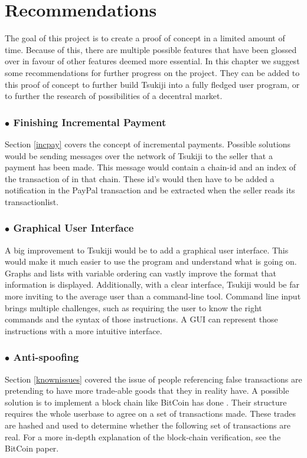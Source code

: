 \section{Recommendations}
\label{recommendations}
The goal of this project is to create a proof of concept in a limited amount of time.
Because of this, there are multiple possible features that have been glossed over in favour of other features deemed more essential.
In this chapter we suggest some recommendations for further progress on the project.
They can be added to this proof of concept to further build Tsukiji into a fully fledged user program, or to further the research of possibilities of a decentral market.

\subsubsection*{$\bullet$ Finishing Incremental Payment}
Section \ref{incpay} covers the concept of incremental payments.
Possible solutions would be sending messages over the network of Tsukiji to the seller that a payment has been made.
This message would contain a chain-id and an index of the transaction of in that chain.
These id's would then have to be added a notification in the PayPal transaction and be extracted when the seller reads its transactionlist.

\subsubsection*{$\bullet$ Graphical User Interface}
A big improvement to Tsukiji would be to add a graphical user interface. 
This would make it much easier to use the program and understand what is going on.
Graphs and lists with variable ordering can vastly improve the format that information is displayed.
Additionally, with a clear interface, Tsukiji would be far more inviting to the average user than a command-line tool.
Command line input brings multiple challenges, such as requiring the user to know the right commands and the syntax of those instructions.
A GUI can represent those instructions with a more intuitive interface.

\subsubsection*{$\bullet$ Anti-spoofing}
Section \ref{knownissues} covered the issue of people referencing false transactions are pretending to have more trade-able goods that they in reality have.
A possible solution is to implement a block chain like BitCoin has done \cite{bitcoin}.
Their structure requires the whole userbase to agree on a set of transactions made.
These trades are hashed and used to determine whether the following set of transactions are real.
For a more in-depth explanation of the block-chain verification, see the BitCoin paper.

